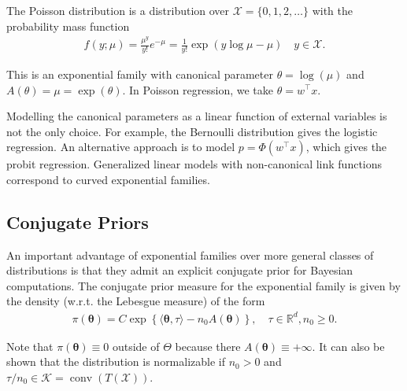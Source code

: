 \begin{eg} 
The Poisson distribution is a distribution over $\mathcal{X}=\{0,1,2, \ldots\}$ with the probability mass function
\begin{align*}
f(y ; \mu)=\frac{\mu^y}{y!} e^{-\mu}=\frac{1}{y!}\exp\left(y\log \mu - \mu\right) \quad y \in \mathcal{X} .
\end{align*}


This is an exponential family with canonical parameter $\theta=\log (\mu)$ and $A(\theta)=\mu=\exp(\theta)$. In Poisson regression, we take $\theta=w^{\top} x$.
\end{eg}

\begin{remark}
    Modelling the canonical parameters as a linear function of external variables is not the only choice. For example, the Bernoulli distribution gives the logistic regression. An alternative approach is to model $p=\Phi\left(w^{\top} x\right)$, which gives the probit regression. Generalized linear models with non-canonical link functions correspond to curved exponential families.
\end{remark}


\subsection{Conjugate Priors}
An important advantage of exponential families over more general classes of distributions is that they admit an explicit conjugate prior for Bayesian computations. The conjugate prior measure for the exponential family is given by the density (w.r.t. the Lebesgue measure) of the form
\begin{align*}
\pi(\boldsymbol{\theta})=C \exp \left\{\langle\boldsymbol{\theta}, \tau\rangle-n_0 A(\boldsymbol{\theta})\right\}, \quad \tau \in \mathbb{R}^d, n_0 \geq 0 .
\end{align*}

Note that $\pi(\boldsymbol{\theta}) \equiv 0$ outside of $\Theta$ because there $A(\boldsymbol{\theta}) \equiv+\infty$. It can also be shown that the distribution is normalizable if $n_0>0$ and $\tau / n_0 \in \mathcal{K}=\operatorname{conv}(T(\mathcal{X}))$.

